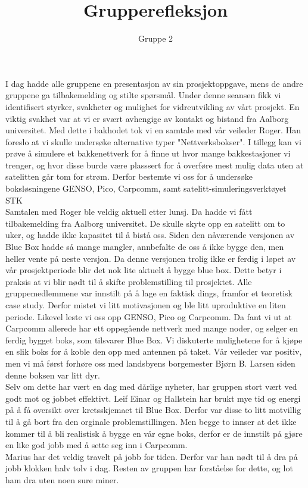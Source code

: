 \documentclass[11pt]{article} %
\title{Grupperefleksjon}
\author{Gruppe 2}
\begin{document}
\maketitle 
I dag hadde alle gruppene en presentasjon av sin prosjektoppgave, mens de andre gruppene ga tilbakemelding og stilte spørsmål. Under denne seansen fikk vi identifisert styrker, svakheter og mulighet for vidreutvikling av vårt prosjekt. En viktig svakhet var at vi er svært avhengige av kontakt og bistand fra Aalborg universitet. Med dette i bakhodet tok vi en samtale med vår veileder Roger. Han foreslo at vi skulle undersøke alternative typer "Nettverksbokser". I tillegg kan vi prøve å simulere et bakkenettverk for å finne ut hvor mange bakkestasjoner vi trenger, og hvor disse burde være plasssert for å overføre mest mulig data uten at satelitten går tom for strøm. Derfor bestemte vi oss for å undersøke boksløsningene GENSO, Pico, Carpcomm, samt satelitt-simuleringsverktøyet STK \\

Samtalen med Roger ble veldig aktuell etter lunsj. Da hadde vi fått tilbakemelding fra Aalborg universitet. De skulle skyte opp en satelitt om to uker, og hadde ikke kapasitet til å bistå oss. Siden den nåværende versjonen av Blue Box hadde så mange mangler, annbefalte de oss å ikke bygge den, men heller vente på neste versjon. Da denne versjonen trolig ikke er ferdig i løpet av vår prosjektperiode blir det nok lite aktuelt å bygge blue box. Dette betyr i praksis at vi blir nødt til å skifte problemstilling til prosjektet. Alle gruppemedlemmene var innstilt på å lage en faktisk dings, framfor et teoretisk case study. Derfor mistet vi litt motivasjonen og ble litt uproduktive en liten periode. Likevel leste vi oss opp GENSO, Pico og Carpcomm. Da fant vi ut at Carpcomm allerede har ett oppegående nettverk med mange noder, og selger en ferdig bygget boks, som tilsvarer Blue Box. Vi diskuterte mulighetene for å kjøpe en slik boks for å koble den opp med antennen på taket. Vår veileder var positiv, men vi må først forhøre oss med landsbyens borgemester Bjørn B. Larsen siden denne boksen var litt dyr.  \\

Selv om dette har vært en dag med dårlige nyheter, har gruppen stort vært ved godt mot og jobbet effektivt. Leif Einar og Hallstein har brukt mye tid og energi på å få oversikt over kretsskjemaet til Blue Box. Derfor var disse to litt motvillig til å gå bort fra den orginale problemstillingen. Men begge to innser at det ikke kommer til å bli realistisk å bygge en vår egne boks, derfor er de innstilt på gjøre en like god jobb med å sette seg inn i Carpcomm. \\

Marius har det veldig travelt på jobb for tiden. Derfor var han nødt til å dra på jobb klokken halv tolv i dag. Resten av gruppen har forståelse for dette, og lot ham dra uten noen sure miner.   
\end{document}
